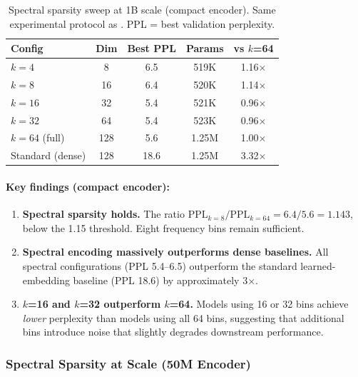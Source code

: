 \documentclass[10pt,twocolumn]{article}
\begin{document}
\begin{table}[t]
\centering
\caption{Spectral sparsity sweep at 1B scale (compact encoder). Same experimental protocol as . PPL = best validation perplexity.}
\label{tab:1b_sparsity}
\small
\begin{tabular}{@{}lcccc@{}}
\toprule
\textbf{Config} & \textbf{Dim} & \textbf{Best PPL} & \textbf{Params} & \textbf{vs $k$=64} \\
\midrule
$k = 4$            & 8   & 6.5  & 519K  & 1.16$\times$ \\
$k = 8$            & 16  & 6.4  & 520K  & 1.14$\times$ \\
$k = 16$           & 32  & 5.4  & 521K  & 0.96$\times$ \\
$k = 32$           & 64  & 5.4  & 523K  & 0.96$\times$ \\
$k = 64$ (full)    & 128 & 5.6  & 1.25M & 1.00$\times$ \\
\midrule
Standard (dense)   & 128 & 18.6 & 1.25M & 3.32$\times$ \\
\bottomrule
\end{tabular}
\end{table}

\paragraph{Key findings (compact encoder):}

\begin{enumerate}[leftmargin=*,nosep]
    \item \textbf{Spectral sparsity holds.} The ratio $\text{PPL}_{k=8} / \text{PPL}_{k=64} = 6.4 / 5.6 = 1.143$, below the 1.15 threshold. Eight frequency bins remain sufficient.

    \item \textbf{Spectral encoding massively outperforms dense baselines.} All spectral configurations (PPL 5.4--6.5) outperform the standard learned-embedding baseline (PPL 18.6) by approximately 3$\times$.

    \item \textbf{$k$=16 and $k$=32 outperform $k$=64.} Models using 16 or 32 bins achieve \emph{lower} perplexity than models using all 64 bins, suggesting that additional bins introduce noise that slightly degrades downstream performance.
\end{enumerate}

\subsubsection{Spectral Sparsity at Scale (50M Encoder)}
\end{document}
